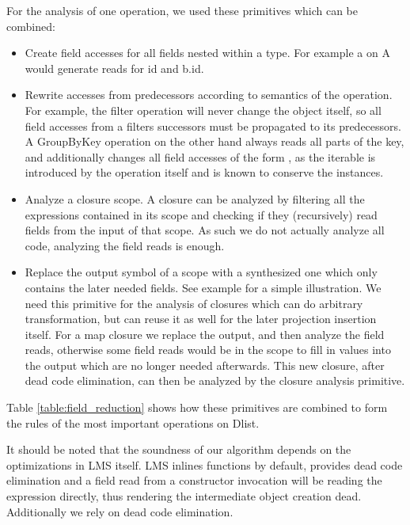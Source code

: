 For the analysis of one operation, we used these primitives which can be combined:
\begin{itemize}
\item Create field accesses for all fields nested within a type. For example a  on A would generate reads for id and b.id. 
\item Rewrite accesses from predecessors according to semantics of the operation. For example, the filter operation will never change the object itself, so all field accesses from a filters successors must be propagated to its predecessors. A GroupByKey operation on the other hand always reads all parts of the key, and additionally changes all field accesses of the form , as the iterable is introduced by the operation itself and is known to conserve the instances.
\item Analyze a closure scope. A closure can be analyzed by filtering all the expressions contained in its scope and checking if they (recursively) read fields from the input of that scope. As such we do not actually analyze all code, analyzing the field reads is enough. 
\item Replace the output symbol of a scope with a synthesized one which only contains the later needed fields. See example  for a simple illustration. We need this primitive for the analysis of closures which can do arbitrary transformation, but can reuse it as well for the later projection insertion itself. For a map closure we replace the output, and then analyze the field reads, otherwise some field reads would be in the scope to fill in values into the output which are no longer needed afterwards. This new closure, after dead code elimination, can then be analyzed by the closure analysis primitive.
\end{itemize}
Table \ref{table:field_reduction} shows how these primitives are combined to form the rules of the most important operations on Dlist.


\bigskip

It should be noted that the soundness of our algorithm depends on the optimizations in LMS itself. LMS inlines functions
by default, provides dead code elimination and a field read from a constructor invocation will be reading the
expression directly, thus rendering the intermediate object creation dead. Additionally we rely on dead code
elimination. 

